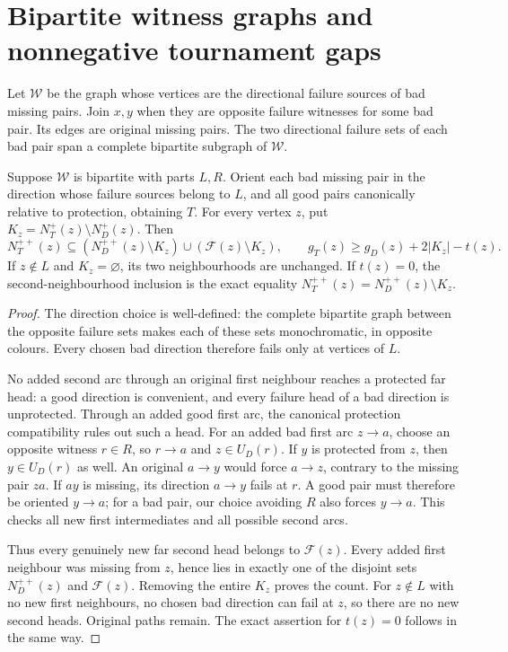 \section{Bipartite witness graphs and nonnegative tournament gaps}
\label{sec:bipartite-witness-completion}

Let $\mathcal W$ be the graph whose vertices are the directional failure
sources of bad missing pairs. Join $x,y$ when they are opposite failure
witnesses for some bad pair. Its edges are original missing pairs.
The two directional failure sets of each bad pair span a complete
bipartite subgraph of $\mathcal W$.

\begin{lemma}
\label{lem:bipartite-selected-source-completion}
Suppose $\mathcal W$ is bipartite with parts $L,R$. Orient each bad
missing pair in the direction whose failure sources belong to $L$,
and all good pairs canonically relative to protection, obtaining $T$.
For every vertex $z$, put $K_z=N_T^+(z)\setminus N_D^+(z)$. Then
\[
 N_T^{++}(z)\subseteq
 (N_D^{++}(z)\setminus K_z)\cup(\mathcal F(z)\setminus K_z),
 \qquad g_T(z)\ge g_D(z)+2|K_z|-t(z).
\]
If $z\notin L$ and $K_z=\varnothing$, its two neighbourhoods are
unchanged. If $t(z)=0$, the second-neighbourhood inclusion is the
exact equality $N_T^{++}(z)=N_D^{++}(z)\setminus K_z$.
\end{lemma}
\begin{proof}
The direction choice is well-defined: the complete bipartite graph
between the opposite failure sets makes each of these sets monochromatic,
in opposite colours. Every chosen bad direction therefore fails only
at vertices of $L$.

No added second arc through an original first neighbour reaches a
protected far head: a good direction is convenient, and every failure
head of a bad direction is unprotected. Through an added good first
arc, the canonical protection compatibility rules out such a head.
For an added bad first arc $z\to a$, choose an opposite witness
$r\in R$, so $r\to a$ and $z\in U_D(r)$.
If $y$ is protected from $z$, then $y\in U_D(r)$ as well.
An original $a\to y$ would force $a\to z$, contrary to the missing
pair $za$. If $ay$ is missing, its direction $a\to y$ fails at $r$.
A good pair must therefore be oriented $y\to a$; for a bad pair,
our choice avoiding $R$ also forces $y\to a$.
This checks all new first intermediates and all possible second arcs.

Thus every genuinely new far second head belongs to $\mathcal F(z)$.
Every added first neighbour was missing from $z$, hence lies in exactly
one of the disjoint sets $N_D^{++}(z)$ and $\mathcal F(z)$.
Removing the entire $K_z$ proves the count.
For $z\notin L$ with no new first neighbours, no chosen bad direction
can fail at $z$, so there are no new second heads. Original paths remain.
The exact assertion for $t(z)=0$ follows in the same way.
\end{proof}

